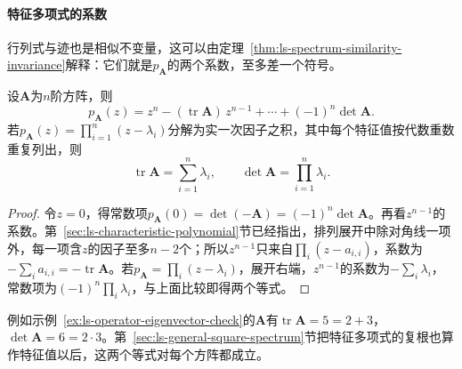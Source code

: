 \paragraph{特征多项式的系数}
行列式与迹也是相似不变量，这可以由定理~\ref{thm:ls-spectrum-similarity-invariance}解释：它们就是$p_{\bm A}$的两个系数，至多差一个符号。
\begin{theorem}[迹、行列式与特征值]
\label{thm:ls-trace-det-eigenvalues}
设$\bm A$为$n$阶方阵，则
\[
 p_{\bm A}(z)=z^n-(\operatorname{tr}\bm A)\,z^{n-1}+\cdots+(-1)^n\det\bm A .
\]
若$p_{\bm A}(z)=\prod_{i=1}^n(z-\lambda_i)$分解为实一次因子之积，其中每个特征值按代数重数重复列出，则
\[
 \operatorname{tr}\bm A=\sum_{i=1}^n\lambda_i,\qquad\det\bm A=\prod_{i=1}^n\lambda_i .
\]
\end{theorem}
\begin{proof}
令$z=0$，得常数项$p_{\bm A}(0)=\det(-\bm A)=(-1)^n\det\bm A$。再看$z^{n-1}$的系数。第~\ref{sec:ls-characteristic-polynomial}节已经指出，排列展开中除对角线一项外，每一项含$z$的因子至多$n-2$个；所以$z^{n-1}$只来自$\prod_i(z-a_{i,i})$，系数为$-\sum_ia_{i,i}=-\operatorname{tr}\bm A$。若$p_{\bm A}=\prod_i(z-\lambda_i)$，展开右端，$z^{n-1}$的系数为$-\sum_i\lambda_i$，常数项为$(-1)^n\prod_i\lambda_i$，与上面比较即得两个等式。
\end{proof}
例如示例~\ref{ex:ls-operator-eigenvector-check}的$\bm A$有$\operatorname{tr}\bm A=5=2+3$，$\det\bm A=6=2\cdot3$。第~\ref{sec:ls-general-square-spectrum}节把特征多项式的复根也算作特征值以后，这两个等式对每个方阵都成立。

